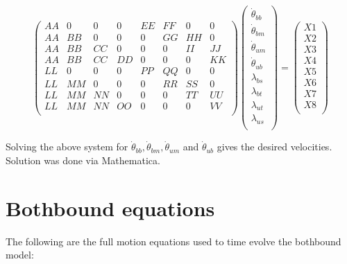 \documentclass[
11pt, %
english, %
singlespacing, %
headsepline, %
chapterinoneline, %
]{MastersDoctoralThesis} %
\begin{document}
\[
\begin{pmatrix}
  AA & 0 & 0 & 0 & EE & FF & 0 & 0\\
  AA & BB & 0 & 0 & 0 & GG & HH & 0\\
  AA & BB & CC & 0 & 0 & 0 & II & JJ\\
  AA & BB & CC & DD & 0 & 0 & 0 & KK\\
  LL & 0 & 0 & 0 & PP & QQ & 0 & 0\\
  LL & MM & 0 & 0 & 0 & RR & SS & 0\\
  LL & MM & NN & 0 & 0 & 0 & TT & UU\\
  LL & MM & NN & OO & 0 & 0 & 0 & VV\\
\end{pmatrix}
\begin{pmatrix}
    \dot{\theta}_{bb}\\
    \dot{\theta}_{bm}\\
    \dot{\theta}_{um}\\
    \dot{\theta}_{ub}\\
    \lambda_{bs}\\
    \lambda_{bt}\\
    \lambda_{ut}\\
    \lambda_{us}\\
  \end{pmatrix}
=
\begin{pmatrix}
  X1\\
  X2\\
  X3\\
  X4\\
  X5\\
  X6\\
  X7\\
  X8\\
\end{pmatrix}
\]

Solving the above system for $\dot{\theta}_{bb}, \dot{\theta}_{bm}, \dot{\theta}_{um}$ and $\dot{\theta}_{ub}$ gives the desired velocities. Solution was done via Mathematica.

\chapter{Bothbound equations} %
\label{sec:AppendixBothboundEquations}

The following are the full motion equations used to time evolve the bothbound model:
\end{document}
